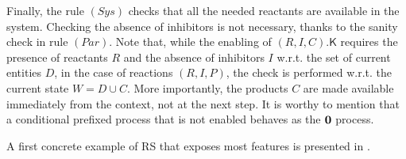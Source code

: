 Finally, the rule $(\textit{Sys})$ checks that all the needed reactants are available in the system. Checking the absence of inhibitors  is not necessary, thanks to the sanity check in rule $(\textit{Par})$.
Note that, while the enabling of $(R,I,C).\mathsf{K}$ requires the presence of reactants $R$ and the absence of inhibitors $I$ w.r.t. the set of current entities $D$, in the case of reactions $(R,I,P)$, the check is performed w.r.t. the current state $W=D\cup C$.
More importantly, the products $C$ are made available immediately from the context, not at the next step.
It is worthy to mention that a conditional prefixed process that is not enabled behaves as the $\mathbf{0}$ process.

A first concrete example of RS that exposes most features is presented in .

